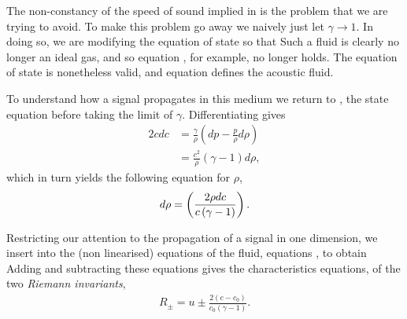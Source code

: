The non-constancy of the speed of sound implied in  is the problem that we are trying to avoid.
To make this problem go away we naively just let $\gamma \rightarrow 1$.
In doing so, we are modifying the equation of state so that
Such a fluid is clearly no longer an ideal gas, and so equation , for example, no longer holds.
The equation of state is nonetheless valid, and equation  defines the acoustic fluid.



To understand how a signal propagates in this medium we return to ,
the state equation before taking the limit of $\gamma$.
Differentiating   gives
\begin{align}
2 c dc &= \frac{\gamma}{\rho} \left(dp - \frac{p}{\rho}d\rho\right)  \\
       &= \frac{c^2}{\rho}\left(\gamma-1\right) d\rho,
\end{align}
which in turn yields the following equation for $\rho$,
\begin{align}
\label{eqn:attemptTwo:dRho}
d\rho = \left(\frac{2\rho dc}{c\lr{\gamma - 1}}\right). %
\end{align}

Restricting our attention to the propagation of a signal in one dimension,
we insert  into the (non linearised) equations of the fluid, equations , to obtain
Adding and subtracting these equations gives the characteristics equations,
of the two {\em Riemann invariants}, 
\begin{align}
R_\pm = u \pm \frac{2(c-c_0)}{c_0(\gamma - 1)}.  %
\end{align}

